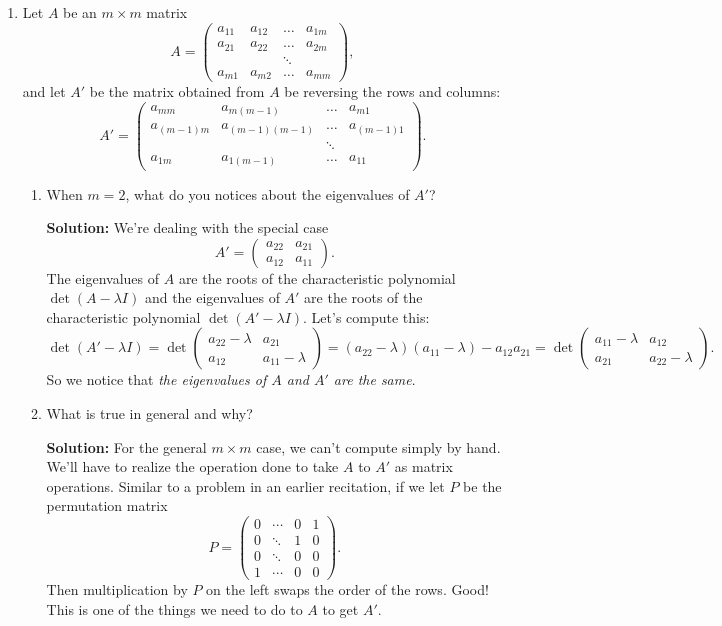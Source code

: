 \documentclass[11pt]{article}
\begin{document}
\begin{enumerate}
\item Let $A$ be an $m \times m$ matrix
\[ A = \begin{pmatrix} a_{11} & a_{12} & \dots & a_{1m} \\ a_{21} & a_{22} & \dots & a_{2m} \\  & & \ddots & \\ a_{m1} & a_{m2} & \dots & a_{mm} \end{pmatrix}, \]
and let $A'$ be the matrix obtained from $A$ be reversing the rows and columns:
\[A' = \begin{pmatrix} a_{mm} & a_{m(m-1)} & \dots & a_{m1} \\ a_{(m-1)m} & a_{(m-1)(m-1)} & \dots & a_{(m-1)1} \\  & & \ddots & \\ a_{1m} & a_{1(m-1)} & \dots & a_{11} \end{pmatrix}. \]

\begin{enumerate}
\item When $m=2$, what do you notices about the eigenvalues of $A'$?

\textbf{Solution:} We're dealing with the special case
\[A' = \begin{pmatrix} a_{22} & a_{21} \\ a_{12} & a_{11} \end{pmatrix}. \]
The eigenvalues of $A$ are the roots of the characteristic polynomial $\det(A - \lambda I)$ and the eigenvalues of $A'$ are the roots of the characteristic polynomial $\det(A' - \lambda I)$.  Let's compute this:
\[\det(A' - \lambda I) = \det \begin{pmatrix} a_{22}-\lambda & a_{21} \\ a_{12} & a_{11} - \lambda \end{pmatrix} = (a_{22}-\lambda)(a_{11} - \lambda) - a_{12}a_{21}  = \det \begin{pmatrix} a_{11}-\lambda & a_{12} \\ a_{21} & a_{22} - \lambda \end{pmatrix}. \]
So we notice that \emph{the eigenvalues of $A$ and $A'$ are the same}.


\item What is true in general and why?

\textbf{Solution:} For the general $m \times m$ case, we can't compute simply by hand.  We'll have to realize the operation done to take $A$ to $A'$ as matrix operations.  Similar to a problem in an earlier recitation, if we let $P$ be the permutation matrix
\[P = \begin{pmatrix} 0 & \cdots & 0 & 1 \\ 0 & \ddots &  1 & 0 \\ 0 & \ddots &  0 & 0 \\ 1 & \cdots &0 & 0 \end{pmatrix}. \]
Then multiplication by $P$ on the left swaps the order of the rows.  Good!  This is one of the things we need to do to $A$ to get $A'$.


\end{enumerate}
\end{enumerate}
\end{document}
